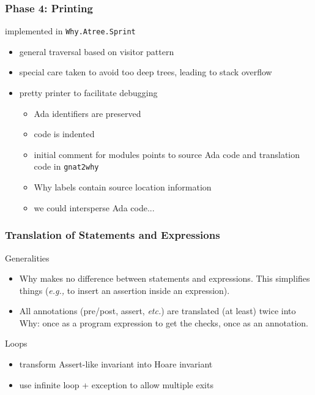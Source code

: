 \documentclass{beamer}
\newcommand{\vs}{\vspace{0.5cm}}
\newcommand{\etc}{\textit{etc.}\xspace}
\newcommand{\eg}{\textit{e.g.,}\xspace}
\newenvironment{specialframe}{%
  \begin{frame}[fragile,environment=specialframe]}{\end{frame}}
\begin{document}
\begin{specialframe}\frametitle{Phase 4: Printing}
  implemented in \verb|Why.Atree.Sprint|

  \vs

      \begin{itemize}
      \item general traversal based on visitor pattern
      \item special care taken to avoid too deep trees, leading to stack
        overflow
      \item pretty printer to facilitate debugging
        \begin{itemize}
        \item Ada identifiers are preserved
        \item code is indented
        \item initial comment for modules points to source Ada code and
          translation code in \verb|gnat2why|
        \item Why labels contain source location information
        \item we could intersperse Ada code...
        \end{itemize}

      \end{itemize}
\end{specialframe}

\begin{specialframe}\frametitle{Translation of Statements and Expressions}
   \begin{block}{Generalities}
      \begin{itemize}
      \item Why makes no difference between statements and expressions. This
        simplifies things (\eg to insert an assertion inside an expression).
      \item All annotations (pre/post, assert, \etc) are translated (at least)
        twice into Why: once as a program expression to get the checks, once as
        an annotation.
      \end{itemize}

   \end{block}

   \begin{block}{Loops}
      \begin{itemize}
         \item transform Assert-like invariant into Hoare invariant
         \item use infinite loop + exception to allow multiple exits
      \end{itemize}
   \end{block}

\end{specialframe}
\end{document}
